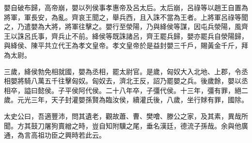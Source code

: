 嬰自破布歸，高帝崩，嬰以列侯事孝惠帝及呂太后。太后崩，呂祿等以趙王自置為將軍，軍長安，為亂。齊哀王聞之，舉兵西，且入誅不當為王者。上將軍呂祿等聞之，乃遣嬰為大將，將軍往擊之。嬰行至滎陽，乃與絳侯等謀，因屯兵滎陽，風齊王以誅呂氏事，齊兵止不前。絳侯等既誅諸呂，齊王罷兵歸，嬰亦罷兵自滎陽歸，與絳侯、陳平共立代王為孝文皇帝。孝文皇帝於是益封嬰三千戶，賜黃金千斤，拜為太尉。

三歲，絳侯勃免相就國，嬰為丞相，罷太尉官。是歲，匈奴大入北地、上郡，令丞相嬰將騎八萬五千往擊匈奴。匈奴去，濟北王反，詔乃罷嬰之兵。後歲餘，嬰以丞相卒，謚曰懿侯。子平侯阿代侯。二十八年卒，子彊代侯。十三年，彊有罪，絕二歲。元光三年，天子封灌嬰孫賢為臨汝侯，續灌氏後，八歲，坐行賕有罪，國除。

太史公曰，吾適豐沛，問其遺老，觀故蕭、曹、樊噲、滕公之家，及其素，異哉所聞。方其鼓刀屠狗賣繒之時，豈自知附驥之尾，垂名漢廷，德流子孫哉。余與他廣通，為言高祖功臣之興時若此云。